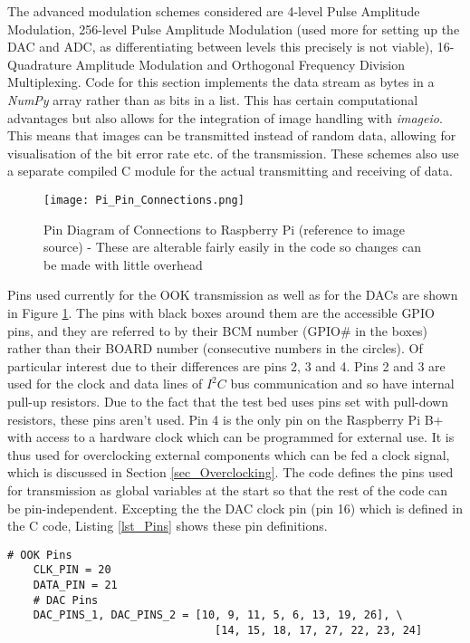 \documentclass[../main.tex]{subfiles}
\begin{document}
The advanced modulation schemes considered are 4-level Pulse Amplitude Modulation, 256-level Pulse Amplitude Modulation (used more for setting up the DAC and ADC, as differentiating between levels this precisely is not viable), 16-Quadrature Amplitude Modulation and Orthogonal Frequency Division Multiplexing.
Code for this section implements the data stream as bytes in a \textit{NumPy} array rather than as bits in a list.
This has certain computational advantages but also allows for the integration of image handling with \textit{imageio}.
This means that images can be transmitted instead of random data, allowing for visualisation of the bit error rate etc. of the transmission.
These schemes also use a separate compiled C module for the actual transmitting and receiving of data.\\

\begin{figure}[ht]
	\centering
	\texttt{[image: Pi\_Pin\_Connections.png]}
	\caption{Pin Diagram of Connections to Raspberry Pi (reference to image source) - These are alterable fairly easily in the code so changes can be made with little overhead}
	\label{fig_Pin Connections}
\end{figure}

Pins used currently for the OOK transmission as well as for the DACs are shown in Figure \ref{fig_Pin Connections}.
The pins with black boxes around them are the accessible GPIO pins, and they are referred to by their BCM number (GPIO\# in the boxes) rather than their BOARD number (consecutive numbers in the circles).
Of particular interest due to their differences are pins 2, 3 and 4.
Pins 2 and 3 are used for the clock and data lines of $I^2C$ bus communication and so have internal pull-up resistors.
Due to the fact that the test bed uses pins set with pull-down resistors, these pins aren't used.
Pin 4 is the only pin on the Raspberry Pi B+ with access to a hardware clock which can be programmed for external use.
It is thus used for overclocking external components which can be fed a clock signal, which is discussed in Section \ref{sec_Overclocking}.
The code defines the pins used for transmission as global variables at the start so that the rest of the code can be pin-independent.
Excepting the the DAC clock pin (pin 16) which is defined in the C code, Listing \ref{lst_Pins} shows these pin definitions.\\

\begin{lstlisting}[caption={Pins used for OOK and the DACs}, label={lst_Pins}]
	# OOK Pins
	CLK_PIN = 20
	DATA_PIN = 21
	# DAC Pins
	DAC_PINS_1, DAC_PINS_2 = [10, 9, 11, 5, 6, 13, 19, 26], \
								[14, 15, 18, 17, 27, 22, 23, 24]
\end{lstlisting} 
\end{document}
